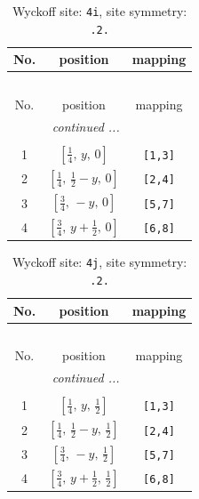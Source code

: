 \documentclass[fleqn,8pt]{jsarticle}
\begin{document}
\renewcommand{\arraystretch}{1.2}
\begin{longtable}{ccc}
\caption{Wyckoff site: {\tt 4i}, site symmetry: {\tt .2.}}
 \\
 \hline \hline
No. & position & mapping \\ \hline \endfirsthead

\multicolumn{2}{l}{\tablename\ \thetable{}} \\
 \hline \hline
No. & position & mapping \\ \hline \endhead

 \hline \hline
\multicolumn{2}{r}{\footnotesize\it continued ...} \\ \endfoot

 \hline \hline
\multicolumn{2}{r}{} \\ \endlastfoot

1 & $\left[ \frac{1}{4},\, y,\, 0 \right]$ & {\tt [1,3]} \\ \hline
2 & $\left[ \frac{1}{4},\, \frac{1}{2} - y,\, 0 \right]$ & {\tt [2,4]} \\ \hline
3 & $\left[ \frac{3}{4},\, - y,\, 0 \right]$ & {\tt [5,7]} \\ \hline
4 & $\left[ \frac{3}{4},\, y + \frac{1}{2},\, 0 \right]$ & {\tt [6,8]} \\
\end{longtable}
\renewcommand{\arraystretch}{1.2}
\begin{longtable}{ccc}
\caption{Wyckoff site: {\tt 4j}, site symmetry: {\tt .2.}}
 \\
 \hline \hline
No. & position & mapping \\ \hline \endfirsthead

\multicolumn{2}{l}{\tablename\ \thetable{}} \\
 \hline \hline
No. & position & mapping \\ \hline \endhead

 \hline \hline
\multicolumn{2}{r}{\footnotesize\it continued ...} \\ \endfoot

 \hline \hline
\multicolumn{2}{r}{} \\ \endlastfoot

1 & $\left[ \frac{1}{4},\, y,\, \frac{1}{2} \right]$ & {\tt [1,3]} \\ \hline
2 & $\left[ \frac{1}{4},\, \frac{1}{2} - y,\, \frac{1}{2} \right]$ & {\tt [2,4]} \\ \hline
3 & $\left[ \frac{3}{4},\, - y,\, \frac{1}{2} \right]$ & {\tt [5,7]} \\ \hline
4 & $\left[ \frac{3}{4},\, y + \frac{1}{2},\, \frac{1}{2} \right]$ & {\tt [6,8]} \\
\end{longtable}
\end{document}
